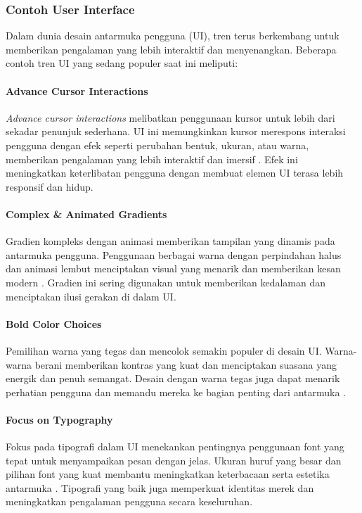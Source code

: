 \documentclass[12pt]{article}
\begin{document}
\subsubsection{Contoh User Interface}

Dalam dunia desain antarmuka pengguna (UI), tren terus berkembang untuk memberikan pengalaman yang lebih interaktif dan menyenangkan. Beberapa contoh tren UI yang sedang populer saat ini meliputi:

\paragraph{Advance Cursor Interactions}
\textit{Advance cursor interactions} melibatkan penggunaan kursor untuk lebih dari sekadar penunjuk sederhana. UI ini memungkinkan kursor merespons interaksi pengguna dengan efek seperti perubahan bentuk, ukuran, atau warna, memberikan pengalaman yang lebih interaktif dan imersif \cite{busche2020}. Efek ini meningkatkan keterlibatan pengguna dengan membuat elemen UI terasa lebih responsif dan hidup.

\paragraph{Complex \& Animated Gradients}
Gradien kompleks dengan animasi memberikan tampilan yang dinamis pada antarmuka pengguna. Penggunaan berbagai warna dengan perpindahan halus dan animasi lembut menciptakan visual yang menarik dan memberikan kesan modern \cite{sutton2020}. Gradien ini sering digunakan untuk memberikan kedalaman dan menciptakan ilusi gerakan di dalam UI.

\paragraph{Bold Color Choices}
Pemilihan warna yang tegas dan mencolok semakin populer di desain UI. Warna-warna berani memberikan kontras yang kuat dan menciptakan suasana yang energik dan penuh semangat. Desain dengan warna tegas juga dapat menarik perhatian pengguna dan memandu mereka ke bagian penting dari antarmuka \cite{coleman2021}.

\paragraph{Focus on Typography}
Fokus pada tipografi dalam UI menekankan pentingnya penggunaan font yang tepat untuk menyampaikan pesan dengan jelas. Ukuran huruf yang besar dan pilihan font yang kuat membantu meningkatkan keterbacaan serta estetika antarmuka \cite{tschichold1995}. Tipografi yang baik juga memperkuat identitas merek dan meningkatkan pengalaman pengguna secara keseluruhan.
\end{document}
